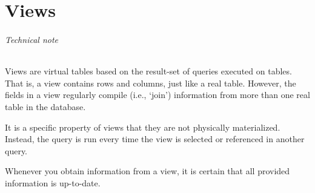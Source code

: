 \chapter{Views}\label{chap_views}

\subparagraph{Technical note}
Views are virtual tables based on the result-set of queries executed on tables.
That is, a view contains rows and columns, just like a real table. 
However, the fields in a view regularly compile (i.e., `join') information from more than one real table in the database.

It is a specific property of views that they are not physically materialized. Instead, the query is run every time the view is selected or referenced in another query.

Whenever you obtain information from a view, it is certain that all provided information is up-to-date.

